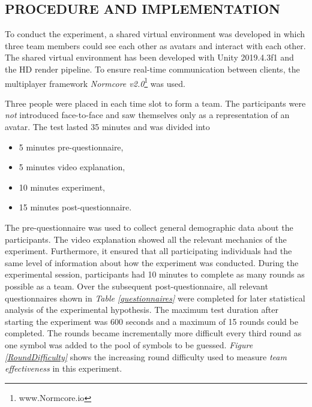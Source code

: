 \documentclass[sigchi]{acmart}
\begin{document}
\subsection{PROCEDURE AND IMPLEMENTATION}
To conduct the experiment, a shared virtual environment was developed in which three team members could see each other as avatars and interact with each other. The shared virtual environment has been developed with Unity 2019.4.3f1 and the HD render pipeline. To ensure real-time communication between clients, the multiplayer framework \textit{Normcore v2.0}\footnote{www.Normcore.io} was used.

Three people were placed in each time slot to form a team. The participants were \textit{not} introduced face-to-face and saw themselves only as a representation of an avatar.
The test lasted 35 minutes and was divided into
		\begin{itemize}
			\item 5 minutes pre-questionnaire,
			\item 5 minutes video explanation,
			\item 10 minutes experiment,
			\item 15 minutes post-questionnaire.
		\end{itemize}
The pre-questionnaire was used to collect general demographic data about the participants. The video explanation showed all the relevant mechanics of the experiment. Furthermore, it ensured that all participating individuals had the same level of information about how the experiment was conducted. During the experimental session, participants had 10 minutes to complete as many rounds as possible as a team. Over the subsequent post-questionnaire, all relevant questionnaires shown in \textit{Table \ref{questionnaires}} were completed for later statistical analysis of the experimental hypothesis. The maximum test duration after starting the experiment was 600 seconds and a maximum of 15 rounds could be completed. The rounds became incrementally more difficult every third round as one symbol was added to the pool of symbols to be guessed.
\textit{Figure \ref{RoundDifficulty}} shows the increasing round difficulty used to measure \textit{team effectiveness} in this experiment.
\end{document}
